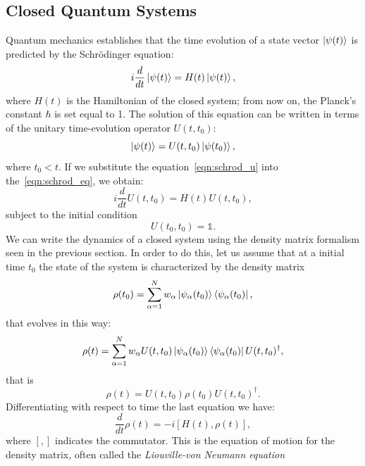 \subsection{Closed Quantum Systems}
\label{closed_systems}
Quantum mechanics establishes that the time evolution of a state vector $\ket{\psi(t)}$ is predicted by the Schrödinger equation:
\begin{equation}
\label{eqn:schrod_eq}
    i\frac{d}{dt}\ket{\psi(t)} = H(t)\ket{\psi(t)},
\end{equation}
where $H(t)$ is the Hamiltonian of the closed system; from now on, the Planck's constant $\hbar$ is set equal to 1.
The solution of this equation can be written in terms of the unitary time-evolution operator $U(t, t_0)$:
\begin{equation}
\label{eqn:schrod_u}
    \ket{\psi(t)} = U(t, t_0)\ket{\psi(t_0)},
\end{equation}
where $t_0 < t$. If we substitute the equation~\ref{eqn:schrod_u} into the~\ref{eqn:schrod_eq}, we obtain:
\begin{equation}
    i\frac{d}{dt}U(t, t_0) = H(t)U(t, t_0),
\end{equation}
subject to the initial condition
\begin{equation}
    U(t_0, t_0) = \mathds{1}.
\end{equation}
We can write the dynamics of a closed system using the density matrix formalism seen in the previous section. In order to do this, let us assume that at a initial time $t_0$ the state of the system is characterized by the density matrix
\begin{equation*}
    \rho(t_0) = \sum_{\alpha = 1}^N w_\alpha \ket{\psi_\alpha(t_0)} \bra{\psi_\alpha(t_0)},
\end{equation*}
that evolves in this way:
\begin{equation*}
    \rho(t) = \sum_{\alpha = 1}^N w_\alpha U(t,t_0)\ket{\psi_\alpha(t_0)} \bra{\psi_\alpha(t_0)}U(t,t_0)^\dagger,
\end{equation*}
that is
\begin{equation*}
     \rho(t) = U(t,t_0) \rho(t_0) U(t,t_0)^\dagger.
\end{equation*}
Differentiating with respect to time the last equation we have:
\begin{equation}
\label{eqn:motion_closed_dm}
    \frac{d}{dt}\rho(t) = -i[H(t), \rho(t)],
\end{equation}
where $[,]$ indicates the commutator. This is the equation of motion for the density matrix, often called the \emph{Liouville-von Neumann equation}~\cite{pet_breuer:open_quantum}



